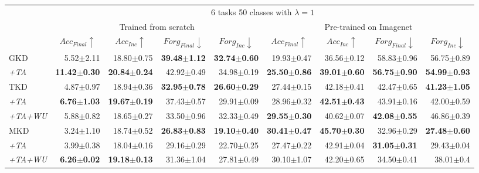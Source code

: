 \begin{appendix}
\begin{table*}[t]
{\begin{tabular}{@{}lrrrrrrrr@{}}
 & \multicolumn{8}{c}{6 tasks 50 classes with $\lambda = 1$}
 \\ \cmidrule{2-9}
 &
  \multicolumn{4}{c}{Trained from scratch} &
  \multicolumn{4}{c}{Pre-trained on Imagenet}
  \\ \cmidrule{2-9}
 &
  \multicolumn{1}{c}{$Acc_{Final} \uparrow$} &
  \multicolumn{1}{c}{$Acc_{Inc} \uparrow$} &
  \multicolumn{1}{c}{$Forg_{Final} \downarrow$} &
  \multicolumn{1}{c}{$Forg_{Inc} \downarrow$} &
  \multicolumn{1}{c}{$Acc_{Final} \uparrow$} &
  \multicolumn{1}{c}{$Acc_{Inc} \uparrow$} &
  \multicolumn{1}{c}{$Forg_{Final} \downarrow$} &
  \multicolumn{1}{c}{$Forg_{Inc} \downarrow$} \\ \cmidrule{2-9}
GKD &
  5.52$\pm$2.11 &
  18.80$\pm$0.75 &
  \textbf{39.48$\pm$1.12} &
  \textbf{32.74$\pm$0.60} &
  19.93$\pm$0.47 &
  36.56$\pm$0.12 &
  58.83$\pm$0.96 &
  56.75$\pm$0.89
   \\
\textit{+TA} &
  \textbf{11.42$\pm$0.30} &
  \textbf{20.84$\pm$0.24} &
  42.92$\pm$0.49 &
  34.98$\pm$0.19 &
  \textbf{25.50$\pm$0.86} &
  \textbf{39.01$\pm$0.60} &
  \textbf{56.75$\pm$0.90} &
  \textbf{54.99$\pm$0.93} \\ \midrule
TKD &
  4.87$\pm$0.97 &
  18.94$\pm$0.36 &
  \textbf{32.95$\pm$0.78} &
  \textbf{26.60$\pm$0.29} &
  27.44$\pm$0.15 &
  42.18$\pm$0.41 &
  42.47$\pm$0.65 &
  \textbf{41.23$\pm$1.05} \\
\textit{+TA} &
  \textbf{6.76$\pm$1.03} &
  \textbf{19.67$\pm$0.19} &
  37.43$\pm$0.57 &
  29.91$\pm$0.09 &
  28.96$\pm$0.32 &
  \textbf{42.51$\pm$0.43} &
  43.91$\pm$0.16 &
  42.00$\pm$0.59 \\
\textit{+TA+WU} &
  5.88$\pm$0.82 &
  18.65$\pm$0.27 &
  33.50$\pm$0.96 &
  32.33$\pm$0.49 &
  \textbf{29.55$\pm$0.30} &
  40.62$\pm$0.07 &
  \textbf{42.08$\pm$0.55} &
  46.86$\pm$0.39
  \\ \midrule

MKD & 3.24$\pm$1.10  & 18.74$\pm$0.52 & \textbf{26.83$\pm$0.83} & \textbf{19.10$\pm$0.40}  & \textbf{30.41$\pm$0.47} & \textbf{45.70$\pm$0.30}   & 32.96$\pm$0.29 & \textbf{27.48$\pm$0.60}  \\
\textit{+TA} & 3.99$\pm$0.38 & 18.04$\pm$0.16 & 29.16$\pm$0.29 & 22.70$\pm$0.25 & 27.47$\pm$0.22 & 42.91$\pm$0.04 & \textbf{31.05$\pm$0.31} & 29.43$\pm$0.04 \\
\textit{+TA+WU} & \textbf{6.26$\pm$0.02} & \textbf{19.18$\pm$0.13} & 31.36$\pm$1.04 & 27.81$\pm$0.49 & 30.10$\pm$1.07 & 42.20$\pm$0.65 & 34.50$\pm$0.41 & 38.01$\pm$0.4

  \\ \midrule


\end{tabular}}
\end{table*}
\end{appendix}

